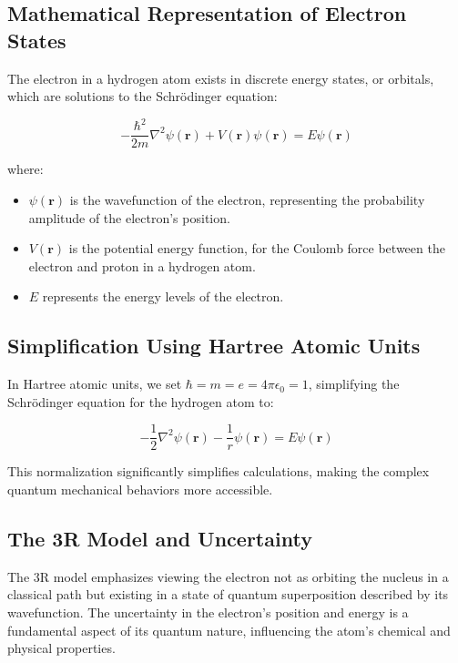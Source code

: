 \documentclass[12pt]{article}
\begin{document}
\subsection*{Mathematical Representation of Electron States}

The electron in a hydrogen atom exists in discrete energy states, or orbitals, which are solutions to the Schrödinger equation:

\begin{equation}
    -\frac{\hbar^2}{2m}\nabla^2\psi(\mathbf{r}) + V(\mathbf{r})\psi(\mathbf{r}) = E\psi(\mathbf{r})
\end{equation}

where:
\begin{itemize}
    \item $\psi(\mathbf{r})$ is the wavefunction of the electron, representing the probability amplitude of the electron's position.
    \item $V(\mathbf{r})$ is the potential energy function, for the Coulomb force between the electron and proton in a hydrogen atom.
    \item $E$ represents the energy levels of the electron.
\end{itemize}

\subsection*{Simplification Using Hartree Atomic Units}

In Hartree atomic units, we set $\hbar = m = e = 4\pi\epsilon_0 = 1$, simplifying the Schrödinger equation for the hydrogen atom to:

\begin{equation}
    -\frac{1}{2}\nabla^2\psi(\mathbf{r}) - \frac{1}{r}\psi(\mathbf{r}) = E\psi(\mathbf{r})
\end{equation}

This normalization significantly simplifies calculations, making the complex quantum mechanical behaviors more accessible.

\subsection*{The 3R Model and Uncertainty}

The 3R model emphasizes viewing the electron not as orbiting the nucleus in a classical path but existing in a state of quantum superposition described by its wavefunction. The uncertainty in the electron's position and energy is a fundamental aspect of its quantum nature, influencing the atom's chemical and physical properties.
\end{document}
